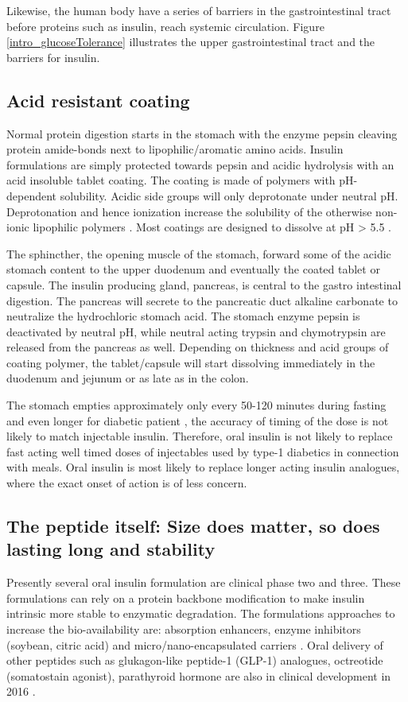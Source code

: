Likewise, the human body have a series of barriers in the gastrointestinal tract before proteins such as insulin, reach systemic circulation. Figure \ref{intro_glucoseTolerance} illustrates the upper gastrointestinal tract and the barriers for insulin.

\subsection{Acid resistant coating}
 Normal protein digestion starts in the stomach with the enzyme pepsin cleaving protein amide-bonds next to lipophilic/aromatic amino acids. Insulin formulations are simply protected towards pepsin and acidic hydrolysis with an acid insoluble tablet coating. The coating is made of polymers with pH-dependent solubility. Acidic side groups will only deprotonate under neutral pH. Deprotonation and hence ionization increase the solubility of the otherwise non-ionic lipophilic polymers \cite{carino1999oral,gabor2010improving}. Most coatings are designed to dissolve at pH > 5.5 \cite{maher2014formulation}.
 
The sphincther, the opening muscle of the stomach, forward some of the acidic stomach content to the upper duodenum and eventually the coated tablet or capsule. The insulin producing gland, pancreas, is central to the gastro intestinal digestion. The pancreas will secrete to the pancreatic duct alkaline carbonate to neutralize the hydrochloric stomach acid. The stomach enzyme pepsin is deactivated by neutral pH, while neutral acting trypsin and chymotrypsin are released from the pancreas as well. Depending on thickness and acid groups of coating polymer, the tablet/capsule will start dissolving immediately in the duodenum and jejunum or as late as in the colon.

The stomach empties approximately only every 50-120 minutes during fasting and even longer for diabetic patient \cite{silverthorn2010human,corvilain1995effect,gabor2010improving}, the accuracy of timing of the dose is not likely to match injectable insulin. Therefore, oral insulin is not likely to replace fast acting well timed doses of injectables used by type-1 diabetics in connection with meals. Oral insulin is most likely to replace longer acting insulin analogues, where the exact onset of action is of less concern.

\subsection{The peptide itself: Size does matter, so does lasting long and stability}
Presently several oral insulin formulation are clinical phase two and three. These formulations can rely on a protein backbone modification to make insulin intrinsic more stable to enzymatic degradation. The formulations approaches to increase the bio-availability are: absorption enhancers, enzyme inhibitors (soybean, citric acid) and micro/nano-encapsulated carriers \cite{aguirre2016current}. Oral delivery of other peptides such as glukagon-like peptide-1 (GLP-1) analogues, octreotide (somatostain agonist), parathyroid hormone are also in clinical development in 2016 \cite{aguirre2016current}.

